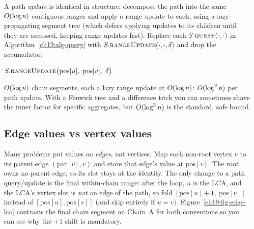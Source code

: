 A path \emph{update} is identical in structure: decompose the path into the same $O(\log n)$
contiguous ranges and apply a range update to each, using a lazy-propagating segment tree (which defers applying updates to its children until they are accessed, keeping range updates fast). Replace
each $S.\textsc{query}(\cdot,\cdot)$ in Algorithm~\ref{ch19:alg-query} with
$S.\textsc{rangeUpdate}(\cdot,\cdot,\delta)$ and drop the accumulator.

\begin{algorithm}[H]
\caption{\textsc{PathUpdate}$(u,v,\delta)$ -- add $\delta$ on the path}
\label{ch19:alg-update}
\DontPrintSemicolon
{}
$S.\textsc{rangeUpdate}\big(\mathrm{pos}[u],\ \mathrm{pos}[v],\ \delta\big)$\;
\end{algorithm}

\begin{complexitybox}
$O(\log n)$ chain segments, each a lazy range update at $O(\log n)$: $O(\log^2 n)$ per path
update. With a Fenwick tree and a difference trick you can sometimes shave the inner factor for
specific aggregates, but $O(\log^2 n)$ is the standard, safe bound.
\end{complexitybox}

\subsection{Edge values vs vertex values}

Many problems put values on \emph{edges}, not vertices. Map each non-root vertex $v$ to its parent
edge $(\mathrm{par}[v],v)$ and store that edge's value at $\mathrm{pos}[v]$. The root owns no parent
edge, so its slot stays at the identity. The only change to a path query/update is the final
within-chain range: after the loop, $u$ is the LCA, and the LCA's vertex slot is \emph{not} an edge of
the path, so fold $[\mathrm{pos}[u]+1,\ \mathrm{pos}[v]]$ instead of $[\mathrm{pos}[u],\mathrm{pos}[v]]$
(and skip entirely if $u=v$). Figure~\ref{ch19:fig-edge-lca} contrasts the final chain segment on
Chain~A for both conventions so you can see why the $+1$ shift is mandatory.

